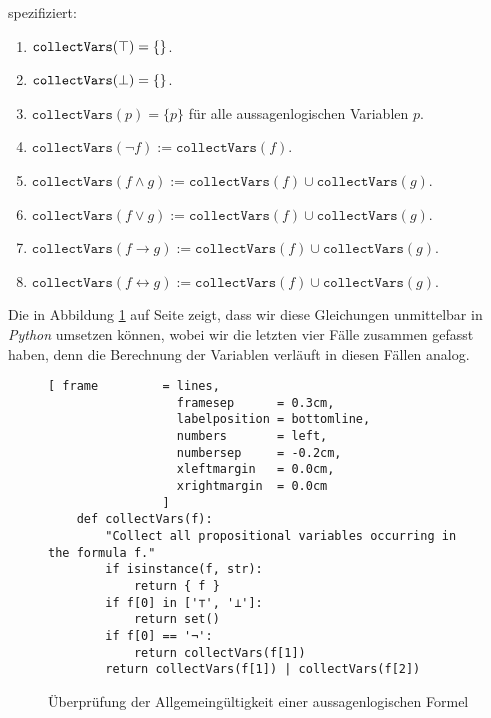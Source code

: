 spezifiziert:
\begin{enumerate}
\item $\mathtt{collectVars}(\top) = \{\}$.
\item $\mathtt{collectVars}(\bot) = \{\}$.
\item $\mathtt{collectVars}(p) = \{ p \}$ \quad für alle aussagenlogischen Variablen $p$.
\item $\mathtt{collectVars}(\neg f) := \mathtt{collectVars}(f)$.
\item $\mathtt{collectVars}(f \wedge g) := \mathtt{collectVars}(f) \cup \mathtt{collectVars}(g)$.
\item $\mathtt{collectVars}(f \vee g) := \mathtt{collectVars}(f) \cup \mathtt{collectVars}(g)$.
\item $\mathtt{collectVars}(f \rightarrow g) := \mathtt{collectVars}(f) \cup \mathtt{collectVars}(g)$.
\item $\mathtt{collectVars}(f \leftrightarrow g) := \mathtt{collectVars}(f) \cup \mathtt{collectVars}(g)$.
\end{enumerate}
Die in Abbildung \ref{fig:tautology.py-collectVars} auf Seite \pageref{fig:tautology.py-collectVars} zeigt,
dass wir diese Gleichungen unmittelbar in \textsl{Python} umsetzen können, wobei wir die letzten vier Fälle
zusammen gefasst haben, denn die Berechnung der Variablen verläuft in diesen Fällen analog.

\begin{figure}[!ht]
  \centering
\begin{Verbatim}[ frame         = lines, 
                  framesep      = 0.3cm, 
                  labelposition = bottomline,
                  numbers       = left,
                  numbersep     = -0.2cm,
                  xleftmargin   = 0.0cm,
                  xrightmargin  = 0.0cm
                ]
    def collectVars(f):
        "Collect all propositional variables occurring in the formula f."
        if isinstance(f, str):
            return { f }
        if f[0] in ['⊤', '⊥']:
            return set()
        if f[0] == '¬':
            return collectVars(f[1])
        return collectVars(f[1]) | collectVars(f[2]) 
\end{Verbatim}
\vspace*{-0.3cm}
  \caption{Überprüfung der Allgemeingültigkeit einer aussagenlogischen Formel}
  \label{fig:tautology.py-collectVars}
\end{figure}

